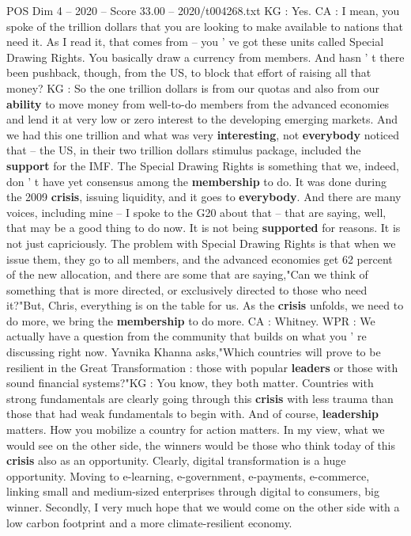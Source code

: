 \begin{textsample}{POS Dim 4 – 2020 – Score 33.00 – 2020/t004268.txt}
KG : Yes.
CA : I mean, you spoke of the trillion dollars that you are looking to make available to nations that need it.
As I read it, that comes from -- you ' ve got these units called Special Drawing Rights.
You basically draw a currency from members.
And hasn ' t there been pushback, though, from the US, to block that effort of raising all that money?
KG : So the one trillion dollars is from our quotas and also from our \textbf{ability} to move money from well-to-do members from the advanced economies and lend it at very low or zero interest to the developing emerging markets.
And we had this one trillion and what was very \textbf{interesting}, not \textbf{everybody} noticed that -- the US, in their two trillion dollars stimulus package, included the \textbf{support} for the IMF.
The Special Drawing Rights is something that we, indeed, don ' t have yet consensus among the \textbf{membership} to do.
It was done during the 2009 \textbf{crisis}, issuing liquidity, and it goes to \textbf{everybody}.
And there are many voices, including mine -- I spoke to the G20 about that -- that are saying, well, that may be a good thing to do now.
It is not being \textbf{supported} for reasons.
It is not just capriciously.
The problem with Special Drawing Rights is that when we issue them, they go to all members, and the advanced economies get 62 percent of the new allocation, and there are some that are saying,"Can we think of something that is more directed, or exclusively directed to those who need it?"But, Chris, everything is on the table for us.
As the \textbf{crisis} unfolds, we need to do more, we bring the \textbf{membership} to do more.
CA : Whitney.
WPR : We actually have a question from the community that builds on what you ' re discussing right now.
Yavnika Khanna asks,"Which countries will prove to be resilient in the Great Transformation : those with popular \textbf{leaders} or those with sound financial systems?"KG : You know, they both matter.
Countries with strong fundamentals are clearly going through this \textbf{crisis} with less trauma than those that had weak fundamentals to begin with.
And of course, \textbf{leadership} matters.
How you mobilize a country for action matters.
In my view, what we would see on the other side, the winners would be those who think today of this \textbf{crisis} also as an opportunity.
Clearly, digital transformation is a huge opportunity.
Moving to e-learning, e-government, e-payments, e-commerce, linking small and medium-sized enterprises through digital to consumers, big winner.
Secondly, I very much hope that we would come on the other side with a low carbon footprint and a more climate-resilient economy.

\end{textsample}
